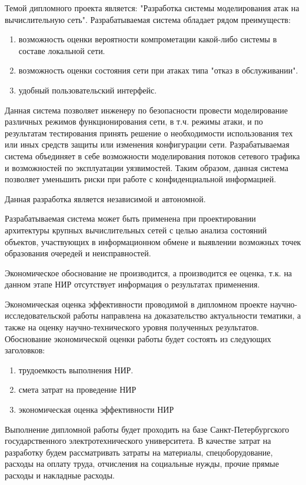 Темой дипломного проекта является: "Разработка системы моделирования атак на вычислительную сеть". Разрабатываемая система обладает рядом преимуществ:
\begin{enumerate}
\item возможность оценки вероятности компрометации какой-либо системы в составе локальной сети.
\item возможность оценки состояния сети при атаках типа "отказ в обслуживании".
\item удобный пользовательский интерфейс.
\end{enumerate}

Данная система позволяет инженеру по безопасности провести моделирование различных режимов функционирования сети, в т.ч.  режимы атаки, и по результатам тестирования принять решение о необходимости использования тех или иных средств защиты или изменения конфигурации сети. Разрабатываемая система объединяет в себе возможности моделирования потоков сетевого трафика и возможностей по эксплуатации уязвимостей. Таким образом, данная система позволяет уменьшить риски при работе с конфиденциальной информацией.

Данная разработка является независимой и автономной.

Разрабатываемая система может быть применена при проектировании архитектуры крупных вычислительных сетей с целью анализа состояний объектов, участвующих в информационном обмене и выявлении возможных точек образования очередей и неисправностей.

Экономическое обоснование не производится, а производится ее оценка, т.к. на данном этапе НИР отсутствует информация о результатах применения.

Экономическая оценка эффективности проводимой в дипломном проекте научно-исследовательской работы направлена на доказательство актуальности тематики, а также на оценку научно-технического уровня полученных результатов. Обоснование экономической оценки работы будет состоять из следующих заголовков:

\begin{enumerate}
\item трудоемкость выполнения НИР.
\item смета затрат на проведение НИР
\item экономическая оценка эффективности НИР
\end{enumerate}

Выполнение дипломной работы будет проходить на базе Санкт-Петербургского государственного электротехнического университета. В качестве затрат на разработку будем рассматривать затраты на материалы, спецоборудование, расходы на оплату труда, отчисления на социальные нужды, прочие прямые расходы и накладные расходы.

